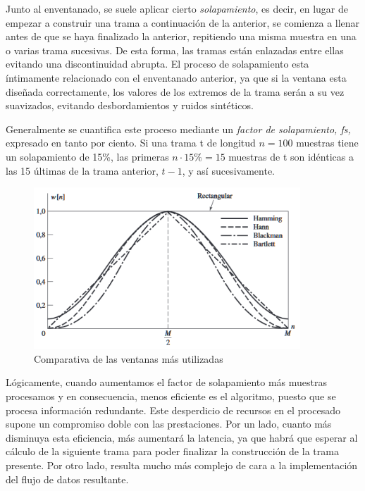 Junto al enventanado, se suele aplicar cierto \emph{solapamiento}, es decir, en lugar de empezar a construir una trama a continuación de la anterior, se comienza a llenar antes de que se haya finalizado la anterior, repitiendo una misma muestra en una o varias trama sucesivas. De esta forma, las tramas están enlazadas entre ellas evitando una discontinuidad abrupta. El proceso de solapamiento esta íntimamente relacionado con el enventanado anterior, ya que si la ventana esta diseñada correctamente, los valores de los extremos de la trama serán a su vez suavizados, evitando desbordamientos y ruidos sintéticos.

Generalmente se cuantifica este proceso mediante un \emph{factor de solapamiento, fs,} expresado en tanto por ciento. Si una trama t de longitud $n = 100$ muestras tiene un solapamiento de 15\%, las primeras $n\cdot15\% = 15$ muestras de t son idénticas a las 15 últimas de la trama anterior, $t-1$, y así sucesivamente.

\begin{figure}[!b]
\begin{center}
\includegraphics[width=10cm]{img/ventanas_grafica.png}
\caption{\label{fig:compven}Comparativa de las ventanas más utilizadas}
\end{center}
\end{figure}

Lógicamente, cuando aumentamos el factor de solapamiento más muestras procesamos y en consecuencia, menos eficiente es el algoritmo, puesto que se procesa información redundante. Este desperdicio de recursos en el procesado supone un compromiso doble con las prestaciones. Por un lado, cuanto más disminuya esta eficiencia, más aumentará la latencia, ya que habrá que esperar al cálculo de la siguiente trama para poder finalizar la construcción de la trama presente. Por otro lado, resulta mucho más complejo de cara a la implementación del flujo de datos resultante. 

